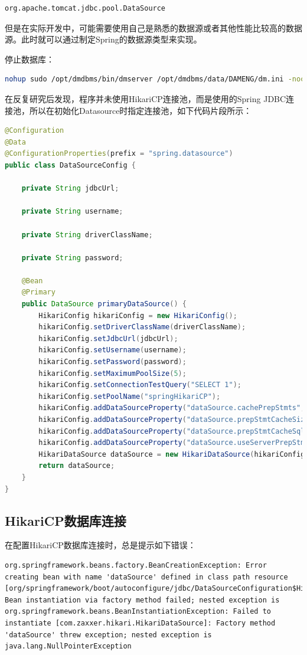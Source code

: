 \documentclass[letter]{book}
\begin{document}
\begin{lstlisting}
org.apache.tomcat.jdbc.pool.DataSource
\end{lstlisting}

但是在实际开发中，可能需要使用自己是熟悉的数据源或者其他性能比较高的数据源。此时就可以通过制定Spring的数据源类型来实现。

停止数据库：

\begin{lstlisting}[language=Bash]
nohup sudo /opt/dmdbms/bin/dmserver /opt/dmdbms/data/DAMENG/dm.ini -noconsole &
\end{lstlisting}

在反复研究后发现，程序并未使用HikariCP连接池，而是使用的Spring JDBC连接池，所以在初始化Datasource时指定连接池，如下代码片段所示：

\begin{lstlisting}[language=Java]
@Configuration
@Data
@ConfigurationProperties(prefix = "spring.datasource")
public class DataSourceConfig {

	private String jdbcUrl;
	
	private String username;
	
	private String driverClassName;
	
	private String password;
	
	@Bean
	@Primary
	public DataSource primaryDataSource() {
		HikariConfig hikariConfig = new HikariConfig();
		hikariConfig.setDriverClassName(driverClassName);
		hikariConfig.setJdbcUrl(jdbcUrl);
		hikariConfig.setUsername(username);
		hikariConfig.setPassword(password);
		hikariConfig.setMaximumPoolSize(5);
		hikariConfig.setConnectionTestQuery("SELECT 1");
		hikariConfig.setPoolName("springHikariCP");
		hikariConfig.addDataSourceProperty("dataSource.cachePrepStmts", "true");
		hikariConfig.addDataSourceProperty("dataSource.prepStmtCacheSize", "250");
		hikariConfig.addDataSourceProperty("dataSource.prepStmtCacheSqlLimit", "2048");
		hikariConfig.addDataSourceProperty("dataSource.useServerPrepStmts", "true");
		HikariDataSource dataSource = new HikariDataSource(hikariConfig);
		return dataSource;
	}
}
\end{lstlisting}

\subsection{HikariCP数据库连接}

在配置HikariCP数据库连接时，总是提示如下错误：

\begin{lstlisting}
org.springframework.beans.factory.BeanCreationException: Error creating bean with name 'dataSource' defined in class path resource [org/springframework/boot/autoconfigure/jdbc/DataSourceConfiguration$Hikari.class]: Bean instantiation via factory method failed; nested exception is org.springframework.beans.BeanInstantiationException: Failed to instantiate [com.zaxxer.hikari.HikariDataSource]: Factory method 'dataSource' threw exception; nested exception is java.lang.NullPointerException
\end{lstlisting}
\end{document}
